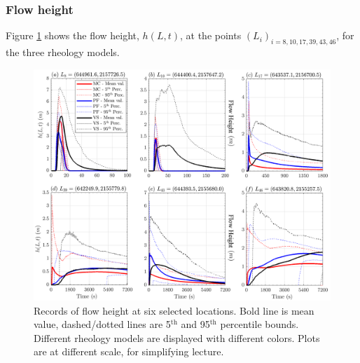 \documentclass{article}
\begin{document}
\subsubsection{Flow height}
Figure \ref{fig:Colima-H} shows the flow height, $h(L,t)$, at the points $(L_i)_{i=8,10,17,39,43,46}$, for the three rheology models.
\begin{figure}[H]
         \centering
        \includegraphics[width=1\textwidth]{BAF_VolcanDeColima/LocalMeasurments/Height.png}
        \caption{Records of flow height at six selected locations. Bold line is mean value, dashed/dotted lines are 5$^{\mathrm{th}}$ and 95$^{\mathrm{th}}$ percentile bounds. Different rheology models are displayed with different colors. Plots are at different scale, for simplifying lecture.}
        \label{fig:Colima-H}
\end{figure}
\end{document}
